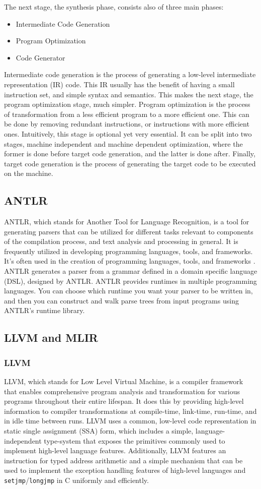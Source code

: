 The next stage, the synthesis phase, consists also of three main phases:
\begin{itemize}
  \item Intermediate Code Generation
  \item Program Optimization
  \item Code Generator
\end{itemize}
Intermediate code generation is the process of generating a low-level
intermediate representation (IR) code. This IR usually has the benefit of having
a small instruction set, and simple syntax and semantics. This makes the next stage, 
the program optimization stage, much simpler.
Program optimization is the process of transformation from a less efficient program 
to a more efficient one. This can be done by removing redundant instructions,
or instructions with more efficient ones. Intuitively, this stage is optional yet
very essential. It can be split into two stages, machine independent and machine
dependent optimization, where the former is done before target code generation,
and the latter is done after.
Finally, target code generation is the process of generating the
target code to be executed on the machine. %
\subsection{ANTLR}
ANTLR, which stands for Another Tool for Language Recognition, is a tool for generating parsers 
that can be utilized for different tasks relevant to components of the compilation process,
and text analysis and processing in general.
It is frequently utilized in developing programming languages, tools, and frameworks.
It's often
used in the creation of programming languages, tools, and frameworks \cite{ANTLR}. ANTLR generates a parser from a grammar defined in a domain
specific language (DSL), designed by ANTLR. ANTLR provides runtimes in multiple
programming languages. You can choose which runtime you want your parser to be
written in, and then you can construct and walk parse trees from input programs using 
ANTLR's runtime library.
\subsection{LLVM and MLIR}
\subsubsection{LLVM}
LLVM, which stands for Low Level Virtual Machine, is a compiler framework that
enables comprehensive program analysis and transformation for various programs
throughout their entire lifespan. It does this by providing high-level
information to compiler transformations at compile-time, link-time, run-time,
and in idle time between runs. LLVM uses a common, low-level code representation
in static single assignment (SSA) form, which includes a simple,
language-independent type-system that exposes the primitives commonly used to
implement high-level language features. Additionally, LLVM features an
instruction for typed address arithmetic and a simple mechanism that can be used
to implement the exception handling features of high-level languages and
\texttt{setjmp}/\texttt{longjmp} in C uniformly and efficiently\cite{LLVM}.
